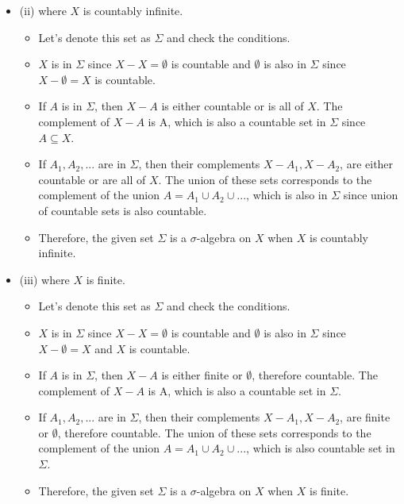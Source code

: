 \documentclass[12pt]{article}
\begin{document}
\begin{itemize}
    \item (ii) where $X$ is countably infinite.
    \begin{itemize}
        \item Let's denote this set as $\Sigma$ and check the conditions.
        \item $X$ is in $\Sigma$ since $X-X=\emptyset$ is countable and $\emptyset$ is also in $\Sigma$ since $X-\emptyset = X$ is countable.
        \item If $A$ is in $\Sigma$, then $X-A$ is either countable or is all of $X$. The complement of $X-A$ is A, which is also a countable set in $\Sigma$ since $A\subseteq X$.
        \item If $A_1,A_2,...$ are in $\Sigma$, then their complements $X-A_1,X-A_2$, are either countable or are all of $X$. The union of these sets corresponds to the complement of the union $A=A_1\cup A_2\cup...$, which is also in $\Sigma$ since union of countable sets is also countable.
        \item Therefore, the given set $\Sigma$ is a $\sigma$-algebra on $X$ when $X$ is countably infinite.
    \end{itemize}
    \item (iii) where $X$ is finite.
    \begin{itemize}
        \item Let's denote this set as $\Sigma$ and check the conditions.
        \item $X$ is in $\Sigma$ since $X-X=\emptyset$ is countable and $\emptyset$ is also in $\Sigma$ since $X-\emptyset = X$ and $X$ is countable.
        \item If $A$ is in $\Sigma$, then $X-A$ is either finite or $\emptyset$, therefore countable. The complement of $X-A$ is A, which is also a countable set in $\Sigma$.
        \item If $A_1,A_2,...$ are in $\Sigma$, then their complements $X-A_1,X-A_2$, are finite or $\emptyset$, therefore countable. The union of these sets corresponds to the complement of the union $A=A_1\cup A_2\cup...$, which is also countable set in $\Sigma$.
        \item Therefore, the given set $\Sigma$ is a $\sigma$-algebra on $X$ when $X$ is finite.
    \end{itemize}
\end{itemize}
\end{document}
